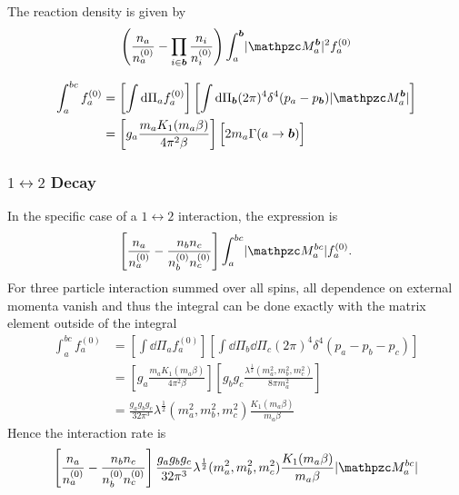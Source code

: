 \documentclass[
  a4paper,             %
  11pt,                %
  oneside,             %
  onecolumn,           %
  bibliography=totoc,  %
  final,               %
]{scrartcl}
\begin{document}
The reaction density is given by
\begin{equation}
  \left( \frac{n_a}{n_a^{(0)}} - \prod_{i \in \vt b} \frac{n_i}{n_i^{(0)}} \right) \int_{a}^{\vt b} \abs{\pzcM_a^{\vt b}}^2 f_a^{(0)}
\end{equation}

\begin{equation}
  \begin{aligned}
    \int_a^{bc} f_a^{(0)}
    &= \left[ \int \dd \Pi_a f_a^{(0)} \right] \left[ \int \dd \Pi_{\vt b} (2 \pi)^4 \delta^4(p_a - p_{\vt b}) \abs{\pzcM_a^{\vt b}} \right] \\
    &= \left[ g_a \frac{m_a K_1(m_a \beta)}{4 \pi^2 \beta} \right] \Big[ 2 m_a \Gamma(a \to \vt b) \Big]
  \end{aligned}
\end{equation}

\subsubsection{\texorpdfstring{\(1 \leftrightarrow 2\)}{1 to 2} Decay}

In the specific case of a \(1 \leftrightarrow 2\) interaction, the expression is
\begin{align}
  \left[ \frac{n_a}{n_a^{(0)}} - \frac{n_b n_c}{n_b^{(0)} n_c^{(0)}} \right] \int_a^{bc} \abs{\pzcM_a^{bc}} f_a^{(0)}.
\end{align}
For three particle interaction summed over all spins, all dependence on external
momenta vanish and thus the integral can be done exactly with the matrix element
outside of the integral
\begin{equation}
  \begin{aligned}
    \int_a^{bc} f_a^{(0)}
    &= \left[ \int \dd \Pi_a f_a^{(0)} \right] \left[ \int \dd \Pi_b \dd \Pi_c (2 \pi)^4 \delta^4(p_a - p_b - p_c) \right] \\
    &= \left[ g_a \frac{m_a K_1(m_a \beta)}{4 \pi^2 \beta} \right] \left[ g_b g_c \frac{\lambda^\frac{1}{2}(m_a^2, m_b^2, m_c^2)}{8 \pi m_a^2} \right] \\
    &= \frac{g_a g_b g_c}{32 \pi^3} \lambda^\frac{1}{2}(m_a^2, m_b^2, m_c^2) \frac{K_1(m_a \beta)}{m_a \beta}
  \end{aligned}
\end{equation}
Hence the interaction rate is
\begin{equation}
  \left[ \frac{n_a}{n_a^{(0)}} - \frac{n_b n_c}{n_b^{(0)} n_c^{(0)}} \right]
  \frac{g_a g_b g_c}{32 \pi^3} \lambda^\frac{1}{2}(m_a^2, m_b^2, m_c^2) \frac{K_1(m_a \beta)}{m_a \beta} \abs{\pzcM_a^{bc}}
\end{equation}
\end{document}
